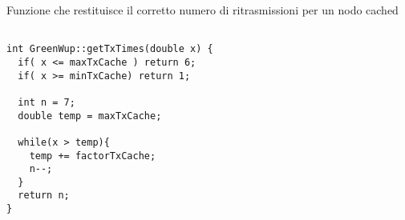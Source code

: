 \begin{listing}[h]
    \caption{Funzione che restituisce il corretto numero di ritrasmissioni per un nodo cached}
    \label{code:getTxTimes_final2.0}
    \begin{verbatim}

int GreenWup::getTxTimes(double x) {
  if( x <= maxTxCache ) return 6;
  if( x >= minTxCache) return 1;

  int n = 7;
  double temp = maxTxCache;
  
  while(x > temp){
    temp += factorTxCache;
    n--;
  }
  return n;
}

    \end{verbatim}
\end{listing}